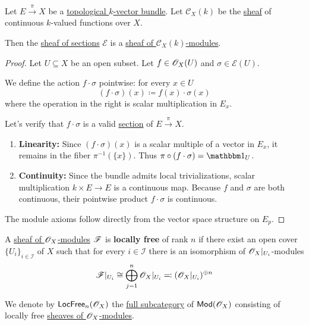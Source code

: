 \documentclass[../../../main]{subfiles}
\begin{document}
\begin{proposition}\label{prop:sheaf-of-sections-topological-vector-bundle-is-C-x-module}
  Let \(E \xrightarrow{\pi} X\) be a \hyperref[def:topological-vector-bundle]{topological \(k\)-vector bundle}.
  Let \(\mathcal{C}_{X}(k)\) be the \hyperref[def:sheaf]{sheaf} of continuous \(k\)-valued functions over \(X\).

  Then the \hyperref[def:sheaf-of-sections-topological-vector-bundle]{sheaf of sections} \(\mathcal{E}\) is a \hyperref[def:sheaf-of-modules]{sheaf of \(\mathcal{C}_{X}(k)\)-modules}.
\end{proposition}
\begin{proof}
  Let \(U \subseteq X\) be an open subset.
  Let \(f \in \mathscr{O}_{X}(U)\) and \(\sigma \in \mathcal{E}(U)\).
  
  We define the action \(f \cdot \sigma\) pointwise: for every \(x \in U\)
  \begin{equation*}
    (f \cdot \sigma)(x) \coloneq f(x) \cdot \sigma(x)
  \end{equation*}
  where the operation in the right is scalar multiplication in \(E_{x}\).

  Let's verify that \(f \cdot \sigma\) is a valid \hyperref[def:section-topological-vector-bundle]{section} of \(E \xrightarrow{\pi} X\).
  \begin{enumerate}
      \item \textbf{Linearity:} Since \((f \cdot \sigma)(x)\) is a scalar multiple of a vector in \(E_{x}\), it remains in the fiber \(\pi^{-1}(\{x\})\). Thus \(\pi \circ (f \cdot \sigma) = \id_{U}\).
      \item \textbf{Continuity:} Since the bundle admits local trivializations, scalar multiplication \(k \times E \to E\) is a continuous map. Because \(f\) and \(\sigma\) are both continuous, their pointwise product \(f \cdot \sigma\) is continuous.
  \end{enumerate}

  The module axioms follow directly from the vector space structure on \(E_{p}\).
\end{proof}

\begin{definition}\label{def:locally-free-sheaf}
  A \hyperref[def:sheaf-of-modules]{sheaf of \(\mathscr{O}_{X}\)-modules} \(\mathscr{F}\) is \textbf{locally free} of rank \(n\) if there exist an open cover \(\{U_{i}\}_{i \in \mathcal{I}}\) of \(X\) such that for every \(i \in \mathcal{I}\) there is an isomorphism of \(\mathscr{O}_{X}|_{U_{i}}\)-modules
  \begin{equation*}
    \mathscr{F}|_{U_{i}} \cong \bigoplus_{j=1}^{n} \mathscr{O}_{X}|_{U_{i}} \eqcolon (\mathscr{O}_{X}|_{U_{i}})^{\oplus n}
  \end{equation*}

  We denote by \(\mathsf{LocFree}_{n}(\mathscr{O}_{X})\) the \hyperref[def:subcategory]{full subcategory} of \(\mathsf{Mod}(\mathscr{O}_{X})\) consisting of locally free \hyperref[def:sheaf-of-modules]{sheaves of \(\mathscr{O}_{X}\)-modules}.
\end{definition}
\end{document}

